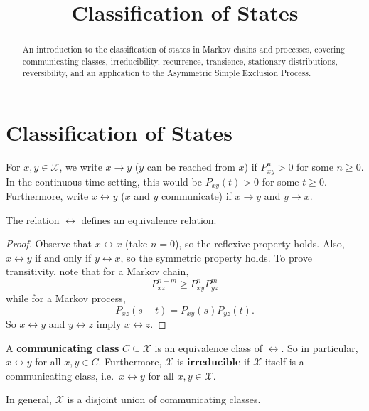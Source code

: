 \documentclass{ximera}
\title{Classification of States}
\begin{document}
\begin{abstract}
An introduction to the classification of states in Markov chains and processes, covering communicating classes, irreducibility, recurrence, transience, stationary distributions, reversibility, and an application to the Asymmetric Simple Exclusion Process.
\end{abstract}
\maketitle

\section*{Classification of States}

\begin{definition}
For $x, y \in \mathcal{X}$, we write $x \to y$ ($y$ can be reached from $x$) if $P^n_{xy} > 0$ for some $n \geq 0$. In the continuous-time setting, this would be $P_{xy}(t) > 0$ for some $t \geq 0$. Furthermore, write $x \leftrightarrow y$ ($x$ and $y$ communicate) if $x \to y$ and $y \to x$.
\end{definition}

\begin{proposition}
The relation $\leftrightarrow$ defines an equivalence relation.
\end{proposition}

\begin{proof}
Observe that $x \leftrightarrow x$ (take $n = 0$), so the reflexive property holds. Also, $x \leftrightarrow y$ if and only if $y \leftrightarrow x$, so the symmetric property holds. To prove transitivity, note that for a Markov chain,
\[
P^{n+m}_{xz} \geq P^n_{xy} P^m_{yz}
\]
while for a Markov process,
\[
P_{xz}(s+t) = P_{xy}(s)P_{yz}(t).
\]
So $x \leftrightarrow y$ and $y \leftrightarrow z$ imply $x \leftrightarrow z$.
\end{proof}

\begin{definition}
A \textbf{communicating class} $C \subseteq \mathcal{X}$ is an equivalence class of $\leftrightarrow$. So in particular, $x \leftrightarrow y$ for all $x, y \in C$. Furthermore, $\mathcal{X}$ is \textbf{irreducible} if $\mathcal{X}$ itself is a communicating class, i.e.\ $x \leftrightarrow y$ for all $x, y \in \mathcal{X}$.
\end{definition}

In general, $\mathcal{X}$ is a disjoint union of communicating classes.
\end{document}
